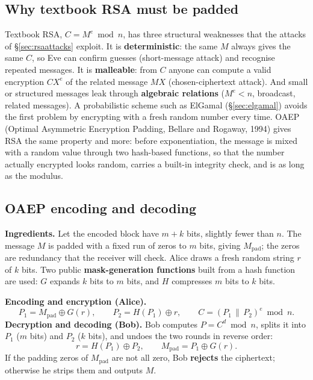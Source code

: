 \subsection{Why textbook RSA must be padded \new}

Textbook RSA, $C = M^e \bmod n$, has three structural weaknesses that the attacks of \S\ref{sec:rsaattacks} exploit. It is \textbf{deterministic}: the same $M$ always gives the same $C$, so Eve can confirm guesses (short-message attack) and recognise repeated messages. It is \textbf{malleable}: from $C$ anyone can compute a valid encryption $C X^e$ of the related message $MX$ (chosen-ciphertext attack). And small or structured messages leak through \textbf{algebraic relations} ($M^e < n$, broadcast, related messages). A probabilistic scheme such as ElGamal (\S\ref{sec:elgamal}) avoids the first problem by encrypting with a fresh random number every time. OAEP (Optimal Asymmetric Encryption Padding, Bellare and Rogaway, 1994) gives RSA the same property and more: before exponentiation, the message is mixed with a random value through two hash-based functions, so that the number actually encrypted looks random, carries a built-in integrity check, and is as long as the modulus.

\subsection{OAEP encoding and decoding \hot\new}

\textbf{Ingredients.} Let the encoded block have $m + k$ bits, slightly fewer than $n$. The message $M$ is padded with a fixed run of zeros to $m$ bits, giving $M_{\text{pad}}$; the zeros are redundancy that the receiver will check. Alice draws a fresh random string $r$ of $k$ bits. Two public \textbf{mask-generation functions} built from a hash function are used: $G$ expands $k$ bits to $m$ bits, and $H$ compresses $m$ bits to $k$ bits.

\textbf{Encoding and encryption (Alice).}
\[
P_1 = M_{\text{pad}} \oplus G(r), \qquad P_2 = H(P_1) \oplus r, \qquad C = (P_1 \,\|\, P_2)^{e} \bmod n .
\]
\textbf{Decryption and decoding (Bob).} Bob computes $P = C^d \bmod n$, splits it into $P_1$ ($m$ bits) and $P_2$ ($k$ bits), and undoes the two rounds in reverse order:
\[
r = H(P_1) \oplus P_2, \qquad M_{\text{pad}} = P_1 \oplus G(r).
\]
If the padding zeros of $M_{\text{pad}}$ are not all zero, Bob \textbf{rejects} the ciphertext; otherwise he strips them and outputs $M$.

